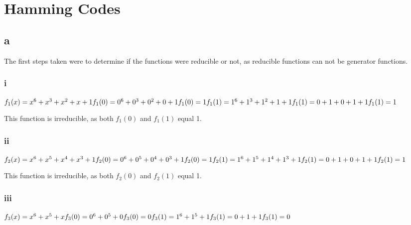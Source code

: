 \section{Hamming Codes}

\subsection{a}
\label{sec:2a}
The first steps taken were to determine if the functions were reducible or not, as reducible functions can not be generator functions.

\subsubsection{i}
$
f_{1}(x) = x^{6} + x^{3} + x^{2} + x + 1 \\
f_{1}(0) = 0^{6} + 0^{3} + 0^{2} + 0 + 1 \\
f_{1}(0) = 1	\\
f_{1}(1) = 1^{6} + 1^{3} + 1^{2} + 1 + 1 \\
f_{1}(1) = 0 + 1 + 0 + 1 + 1	\\
f_{1}(1) = 1	\\
$

This function is irreducible, as both $f_{1}(0)$ and $f_{1}(1)$ equal 1.

\subsubsection{ii}
$
f_{2}(x) = x^{6} + x^{5} + x^{4} + x^{3} + 1 	\\
f_{2}(0) = 0^{6} + 0^{5} + 0^{4} + 0^{3} + 1 	\\
f_{2}(0) = 1	\\
f_{2}(1) = 1^{6} + 1^{5} + 1^{4} + 1^{3} + 1 	\\
f_{2}(1) = 0 + 1 + 0 + 1 + 1 	\\
f_{2}(1) = 1 	\\
$

This function is irreducible, as both $f_{2}(0)$ and $f_{2}(1)$ equal 1.

\subsubsection{iii}
$
f_{3}(x) = x^{6} + x^{5} + x 	\\
f_{3}(0) = 0^{6} + 0^{5} + 0 	\\
f_{3}(0) = 0	\\
f_{3}(1) = 1^{6} + 1^{5} + 1 	\\
f_{3}(1) = 0 + 1 + 1 	\\
f_{3}(1) = 0 	\\
$

